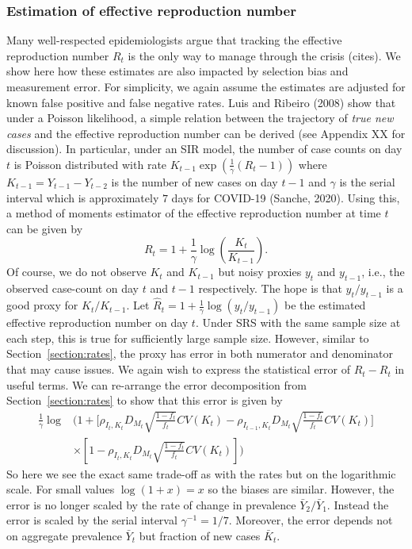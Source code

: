 \documentclass[aoas]{amsart}
\begin{document}
\subsubsection{Estimation of effective reproduction number}
Many well-respected epidemiologists argue that tracking the effective reproduction number $R_t$ is the only way to manage through the crisis (cites).  We show here how these estimates are also impacted by selection bias and measurement error.  For simplicity, we again assume the estimates are adjusted for known false positive and false negative rates. Luis and Ribeiro (2008) show that under a Poisson likelihood, a simple relation between the trajectory of \emph{true new cases} and the effective reproduction number can be derived (see Appendix XX for discussion).  In particular, under an SIR model, the number of case counts on day $t$ is Poisson distributed with rate $K_{t-1} \exp \left( \frac{1}{\gamma} (R_t - 1) \right)$ where $K_{t-1} = Y_{t-1}-Y_{t-2}$ is the number of new cases on day $t-1$ and $\gamma$ is the serial interval which is approximately $7$ days for COVID-19 (Sanche, 2020).  Using this, a method of moments estimator of the effective reproduction number at time $t$ can be given by
$$
R_t = 1 + \frac{1}{\gamma} \log \left( \frac{K_t}{K_{t-1}} \right).
$$
Of course, we do not observe $K_t$ and $K_{t-1}$ but noisy proxies $y_t$ and $y_{t-1}$, i.e., the observed case-count on day $t$ and $t-1$ respectively. The hope is that $y_t/y_{t-1}$ is a good proxy for $K_t/K_{t-1}$. Let $\hat R_t = 1 + \frac{1}{\gamma} \log \left( y_t / y_{t-1} \right)$ be the estimated effective reproduction number on day $t$.  Under SRS with the same sample size at each step, this is true for sufficiently large sample size.  However, similar to Section~\ref{section:rates}, the proxy has error in both numerator and denominator that may cause issues.  We again wish to express the statistical error of $\hat R_t - R_t$ in useful terms.  We can re-arrange the error decomposition from Section~\ref{section:rates} to show that this error is given by
$$
\begin{aligned}
\frac{1}{\gamma}\log &\bigg( 1 + \bigg[ \rho_{I_t,K_t} D_{M_t} \sqrt{\frac{1-f_t}{f_t}} CV (K_t)  -\rho_{I_{t-1},K_t} D_{M_t} \sqrt{\frac{1-f_t}{f_t}} CV (K_t) \bigg] \\
&\times \left[ 1 - \rho_{I_t,K_t} D_{M_t} \sqrt{\frac{1-f_t}{f_t}} CV (K_t) \right] \bigg)
\end{aligned}
$$
So here we see the exact same trade-off as with the rates but on the logarithmic scale.  For small values $\log(1+x) = x$ so the biases are similar.  However, the error is no longer scaled by the rate of change in prevalence $\bar Y_2/\bar Y_1$. Instead the error is scaled by the serial interval $\gamma^{-1} = 1/7$.  Moreover, the error depends not on aggregate prevalence $\bar Y_t$ but fraction of new cases $\bar K_t$.
\end{document}

